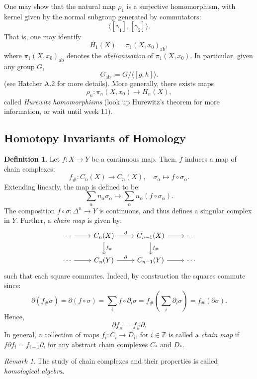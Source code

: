 \documentclass[a4paper]{report}
\theoremstyle{definition}
\newtheorem{definition}{Definition}
\theoremstyle{remark}
\newtheorem{remark}{Remark}
\theoremstyle{proposition}
\theoremstyle{conjecture}
\theoremstyle{lemma}
\theoremstyle{corollary}
\theoremstyle{exercise}
\newcommand{\on}{\operatorname}
\begin{document}
One may show that the natural map $\rho_1$ is a surjective homomorphism, with kernel given by the 
normal subgroup generated by commutators: 
$$\langle [\gamma_1], [\gamma_2] \rangle.$$
That is, one may identify 
$$H_1(X) = \pi_1(X,x_0)_{\on{ab}},$$
where $\pi_1(X,x_0)_{\on{ab}}$ denotes the \emph{abelianisation} of $\pi_1(X,x_0)$.
In particular, given any group $G$, $$G_{\on{ab}} := G /\langle [g,h]\rangle.$$
(see Hatcher A.2 for more details). 
More generally, there exists maps 
$$\rho_n : \pi_n(X,x_0) \longrightarrow H_n(X),$$
called \emph{Hurewitz homomorphisms} (look up Hurewitz's theorem for more information, or 
wait until week 11). 

\subsection{Homotopy Invariants of Homology}


\begin{definition}
    Let $f : X \to Y$ be a continuous map. Then, $f$ induces a map of chain complexes:
    $$f_\# : C_n(X) \longrightarrow C_n(X), \quad \sigma_\alpha \longmapsto f \circ \sigma_\alpha.$$
    Extending linearly, the map is defined to be:
    $$\sum_\alpha n_\alpha \sigma_\alpha \longmapsto \sum_\alpha n_\alpha \left(f\circ \sigma_\alpha\right).$$
    The composition $f\circ \sigma : \Delta^n \to Y$ is continuous, and thus defines a singular complex in 
    $Y$. Further, a \emph{chain map} is given by:
    $$\begin{tikzcd}
        \cdots \arrow[r] & C_n(X) \arrow[r, "\partial"] \arrow[d, "f_\#"] & C_{n-1}(X) \arrow[r] \arrow[d, "f_\#"] & \cdots \\
        \cdots \arrow[r] & C_n(Y) \arrow[r, "\partial"]                   & C_{n-1}(Y) \arrow[r]                   & \cdots
    \end{tikzcd}$$
    such that each square commutes. Indeed, by construction the squares commute since:
    $$\partial (f_\# \sigma) = \partial (f \circ \sigma) = \sum_i f\circ \partial_i\sigma = f_\# \left(\sum_i \partial_i\sigma\right) = f_\#(\partial \sigma).$$
    Hence, $$\partial f_\# = f_\# \partial.$$
    In general, a collection of maps $f_i : C_i \to D_i$, for $i \in \mathbb{Z}$ is called a \emph{chain map} 
    if $f \partial f_i = f_{i-1}\partial$, for any abstract chain complexes $C_\ast$ and $D_\ast$.
\end{definition}

\begin{remark}
    The study of chain complexes and their properties is called \emph{homological algebra}.
\end{remark}
\end{document}
